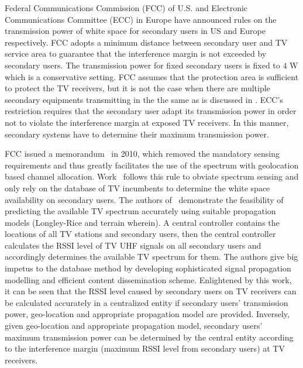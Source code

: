 Federal Communications Commission (FCC) of U.S. and Electronic Communications Committee (ECC) in Europe have announced rules on the transmission power of white space for secondary users in US and Europe respectively\cite{FCC_2010_sedond_memorandumm, ecc159}. FCC adopts a minimum distance between secondary user and TV service area to guarantee that the interference margin is not exceeded by secondary users. The transmission power for fixed secondary users is fixed to $4$ W which is a conservative setting. %
FCC assumes that the protection area is sufficient to protect the TV receivers, but it is not the case when there are multiple secondary equipments transmitting in the the same as is discussed in \cite{Jaentti11}. ECC's restriction requires that the secondary user adapt its transmission power in order not to violate the interference margin at exposed TV receivers. In this manner, secondary systems have to determine their maximum transmission power.

FCC issued a memorandum~\cite{FCC_2010_sedond_memorandumm,FCCdatabasae} in 2010, which removed the mandatory sensing requirements and thus greatly facilitates the use of the spectrum with geolocation based channel allocation.
Work~\cite{SenseLess2011} follows this rule to obviate spectrum sensing and only rely on the database of TV incumbents to determine the white space availability on secondary users. 
The authors of~\cite{SenseLess2011} demonstrate the feasibility of predicting the available TV spectrum accurately using suitable propagation models (Longley-Rice and terrain wherein). 
A central controller contains the locations of all TV stations and secondary users, then the central controller calculates the RSSI level of TV UHF signals on all secondary users and accordingly determines the available TV spectrum for them. 
The authors give big impetus to the database method by developing sophisticated signal propagation modelling and efficient content dissemination scheme. 
Enlightened by this work, it can be seen that the RSSI level caused by secondary users on TV receivers can be calculated accurately in a centralized entity if secondary users' transmission power, geo-location and appropriate propagation model are provided. 
Inversely, given geo-location and appropriate propagation model, secondary users' maximum transmission power can be determined by the central entity according to the interference margin (maximum RSSI level from secondary users) at TV receivers. 

